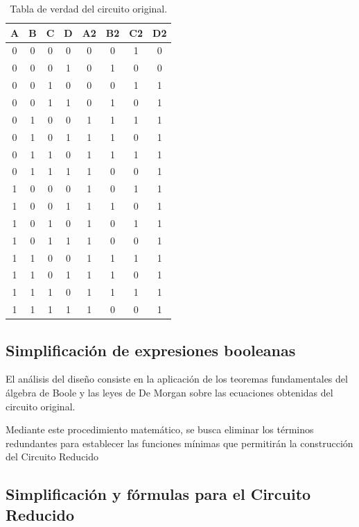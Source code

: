 \documentclass[12pt,letterpaper]{article}
\begin{document}
    \begin{table}[h]
    \centering
    \begin{tabular}{|c|c|c|c|c|c|c|c|}
    \hline
    A & B & C & D & A2 & B2 & C2 & D2 \\ \hline
    0 & 0 & 0 & 0 & 0 & 0 & 1 & 0 \\ \hline
    0 & 0 & 0 & 1 & 0 & 1 & 0 & 0 \\ \hline
    0 & 0 & 1 & 0 & 0 & 0 & 1 & 1 \\ \hline
    0 & 0 & 1 & 1 & 0 & 1 & 0 & 1 \\ \hline
    0 & 1 & 0 & 0 & 1 & 1 & 1 & 1 \\ \hline
    0 & 1 & 0 & 1 & 1 & 1 & 0 & 1 \\ \hline
    0 & 1 & 1 & 0 & 1 & 1 & 1 & 1 \\ \hline
    0 & 1 & 1 & 1 & 1 & 0 & 0 & 1 \\ \hline
    1 & 0 & 0 & 0 & 1 & 0 & 1 & 1 \\ \hline
    1 & 0 & 0 & 1 & 1 & 1 & 0 & 1 \\ \hline
    1 & 0 & 1 & 0 & 1 & 0 & 1 & 1 \\ \hline
    1 & 0 & 1 & 1 & 1 & 0 & 0 & 1 \\ \hline
    1 & 1 & 0 & 0 & 1 & 1 & 1 & 1 \\ \hline
    1 & 1 & 0 & 1 & 1 & 1 & 0 & 1 \\ \hline
    1 & 1 & 1 & 0 & 1 & 1 & 1 & 1 \\ \hline
    1 & 1 & 1 & 1 & 1 & 0 & 0 & 1 \\ \hline
    \end{tabular}
    \caption{Tabla de verdad del circuito original.}
    \label{tab:dVerdad}
    \end{table}

    \subsection{Simplificación de expresiones booleanas}

    El análisis del diseño consiste en la aplicación de los teoremas fundamentales del álgebra de Boole y las leyes de De Morgan sobre las ecuaciones obtenidas del circuito original. 

    Mediante este procedimiento matemático, se busca eliminar los términos redundantes para establecer las funciones mínimas que permitirán la construcción del Circuito Reducido

    \subsection{Simplificación y fórmulas para el Circuito Reducido}
\end{document}
